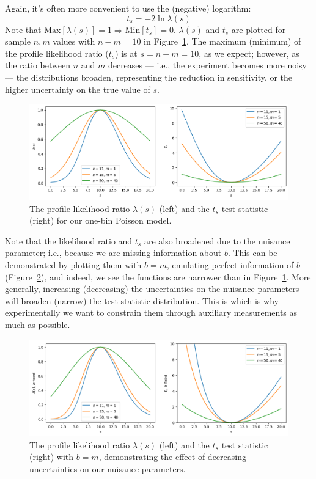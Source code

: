 Again, it's often more convenient to use the (negative) logarithm:
\begin{equation}
\label{eq:ts}
t_s = -2 \ln \lambda(s)
\end{equation}
Note that $\mathrm{Max}[\lambda(s)] = 1 \Rightarrow \mathrm{Min}[t_s] = 0$.
$\lambda(s)$ and $t_s$ are plotted for sample $n, m$ values with $n - m = 10$ in Figure~\ref{fig:plr}.
The maximum (minimum) of the profile likelihood ratio ($t_s$) is at $s = n - m = 10$, as we expect; however, as the ratio between $n$ and $m$ decreases --- i.e., the experiment becomes more noisy --- the distributions broaden, representing the reduction in sensitivity, or the higher uncertainty on the true value of $s$.

\begin{figure}[htb]
    \centering
    \includegraphics[width=\textwidth]{figures/01-intro/2.png}
    \caption{The profile likelihood ratio $\lambda(s)$ (left) and the $t_s$ test statistic (right) for our one-bin Poisson model.}
    \label{fig:plr}
\end{figure}

Note that the likelihood ratio and $t_s$ are also broadened due to the nuisance parameter; i.e., because we are missing information about $b$.
This can be demonstrated by plotting them with $b = m$, emulating perfect information of $b$ (Figure~\ref{fig:plr_nob}), and indeed, we see the functions are narrower than in Figure~\ref{fig:plr}.
More generally, increasing (decreasing) the uncertainties on the nuisance parameters will broaden (narrow) the test statistic distribution.
This is which is why experimentally we want to constrain them through auxiliary measurements as much as possible.

\begin{figure}[tb]
    \centering
    \includegraphics[width=\textwidth]{figures/01-intro/3.png}
    \caption{The profile likelihood ratio $\lambda(s)$ (left) and the $t_s$ test statistic (right) with $b = m$, demonstrating the effect of decreasing uncertainties on our nuisance parameters.}
    \label{fig:plr_nob}
\end{figure}

